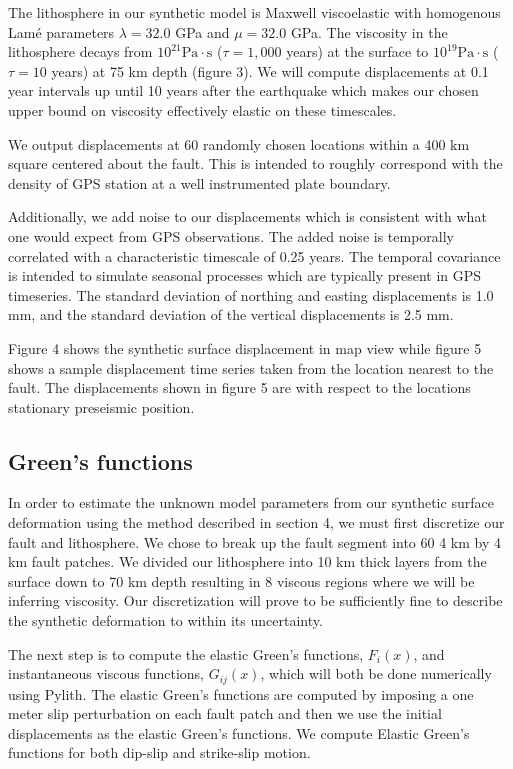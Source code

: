 \documentclass[12pt]{article}
\begin{document}
The lithosphere in our synthetic model is Maxwell viscoelastic with
homogenous Lam\'e parameters $\lambda = 32.0$ GPa and $\mu = 32.0$
GPa.  The viscosity in the lithosphere decays from
$10^{21}\mathrm{Pa}\cdot\mathrm{s}$ ($\tau = 1,000$ years) at the
surface to $10^{19}\mathrm{Pa}\cdot\mathrm{s}$ ($\tau = 10$ years) at
75 km depth (figure 3).  We will compute displacements at 0.1 year
intervals up until 10 years after the earthquake which makes our
chosen upper bound on viscosity effectively elastic on these
timescales.

We output displacements at 60 randomly chosen locations within a 400
km square centered about the fault.  This is intended to roughly correspond with the
density of GPS station at a well instrumented plate boundary.

Additionally, we add noise to our displacements which is consistent
with what one would expect from GPS observations.  The added noise is
temporally correlated with a characteristic timescale of 0.25 years.
The temporal covariance is intended to simulate seasonal processes
which are typically present in GPS timeseries.  The standard deviation
of northing and easting displacements is 1.0 mm, and the standard
deviation of the vertical displacements is 2.5 mm.

Figure 4 shows the synthetic surface displacement in map view while
figure 5 shows a sample displacement time series taken from the
location nearest to the fault.  The displacements shown in figure 5
are with respect to the locations stationary preseismic position.  

\subsection{Green's functions}
In order to estimate the unknown model parameters from our
synthetic surface deformation using the method described in section 4,
we must first discretize our fault and lithosphere.  We chose
to break up the fault segment into 60 4 km by 4 km fault patches. We
divided our lithosphere into 10 km thick layers from the surface down
to 70 km depth resulting in 8 viscous regions where we will be
inferring viscosity. Our discretization will prove to be sufficiently
fine to describe the synthetic deformation to within its uncertainty.

The next step is to compute the elastic Green's functions, $F_i(x)$, and
instantaneous viscous functions, $G_{ij}(x)$, which will both be done
numerically using Pylith.  The elastic Green’s functions are computed
by imposing a one meter slip perturbation on each fault patch and then
we use the initial displacements as the elastic Green’s functions.  We
compute Elastic Green's functions for both dip-slip and
strike-slip motion. 
\end{document}
